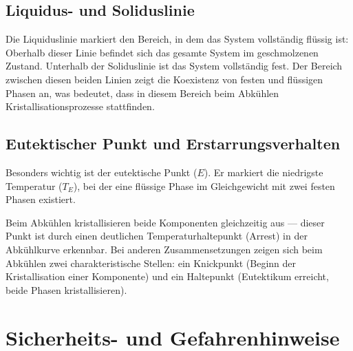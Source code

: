 \subsection{Liquidus- und Soliduslinie}

Die Liquiduslinie markiert den Bereich, in dem das System vollständig flüssig ist: Oberhalb dieser Linie befindet sich das gesamte System im geschmolzenen Zustand.
Unterhalb der Soliduslinie ist das System vollständig fest. 
Der Bereich zwischen diesen beiden Linien zeigt die Koexistenz von festen und flüssigen Phasen an, was bedeutet, dass in diesem Bereich beim Abkühlen Kristallisationsprozesse stattfinden.

\subsection{Eutektischer Punkt und Erstarrungsverhalten}

Besonders wichtig ist der eutektische Punkt ($E$).
Er markiert die niedrigste Temperatur ($T_E$), bei der eine flüssige Phase im Gleichgewicht mit zwei festen Phasen existiert.\autocite{t3_skript}

Beim Abkühlen kristallisieren beide Komponenten gleichzeitig aus --- dieser Punkt ist durch einen deutlichen Temperaturhaltepunkt (Arrest) in der Abkühlkurve erkennbar.
Bei anderen Zusammensetzungen zeigen sich beim Abkühlen zwei charakteristische Stellen: ein Knickpunkt (Beginn der Kristallisation einer Komponente) und ein Haltepunkt (Eutektikum erreicht, beide Phasen kristallisieren). 

\section{Sicherheits- und Gefahrenhinweise}

\hfill
{} \\

\hfill
{} \\


